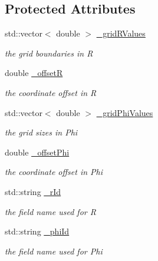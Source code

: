 \subsection*{Protected Attributes}
\begin{DoxyCompactItemize}
\item 
std::vector$<$ double $>$ \hyperlink{class_d_d4hep_1_1_d_d_segmentation_1_1_polar_grid_r_phi2_a036c555ece1b698614ed4186f97a72d4}{\_\-gridRValues}
\begin{DoxyCompactList}\small\item\em the grid boundaries in R \item\end{DoxyCompactList}\item 
double \hyperlink{class_d_d4hep_1_1_d_d_segmentation_1_1_polar_grid_r_phi2_a775bd660c36c5310b65195f3080e92fe}{\_\-offsetR}
\begin{DoxyCompactList}\small\item\em the coordinate offset in R \item\end{DoxyCompactList}\item 
std::vector$<$ double $>$ \hyperlink{class_d_d4hep_1_1_d_d_segmentation_1_1_polar_grid_r_phi2_a078188d23dac5d6ed26c85dddf0f9e74}{\_\-gridPhiValues}
\begin{DoxyCompactList}\small\item\em the grid sizes in Phi \item\end{DoxyCompactList}\item 
double \hyperlink{class_d_d4hep_1_1_d_d_segmentation_1_1_polar_grid_r_phi2_aab823b5b9e861ba2db50721d800d451a}{\_\-offsetPhi}
\begin{DoxyCompactList}\small\item\em the coordinate offset in Phi \item\end{DoxyCompactList}\item 
std::string \hyperlink{class_d_d4hep_1_1_d_d_segmentation_1_1_polar_grid_r_phi2_a93baa19a86e2412bf85fe2749c9d2bb4}{\_\-rId}
\begin{DoxyCompactList}\small\item\em the field name used for R \item\end{DoxyCompactList}\item 
std::string \hyperlink{class_d_d4hep_1_1_d_d_segmentation_1_1_polar_grid_r_phi2_a95332f186af59bd325277868ffeb3ea6}{\_\-phiId}
\begin{DoxyCompactList}\small\item\em the field name used for Phi \item\end{DoxyCompactList}\end{DoxyCompactItemize}


